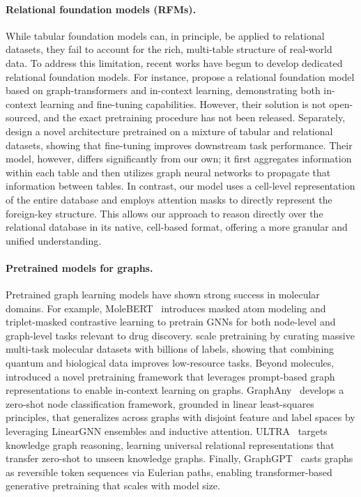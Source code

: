 \paragraph{Relational foundation models (RFMs).}
While tabular foundation models can, in principle, be applied to relational datasets, they fail to account for the rich, multi-table structure of real-world data. To address this limitation, recent works have begun to develop dedicated relational foundation models.
For instance, \citet{kumorfm} propose a relational foundation model based on graph-transformers and in-context learning, demonstrating both in-context learning and fine-tuning capabilities. However, their solution is not open-sourced, and the exact pretraining procedure has not been released. Separately, \citet{griffin} design a novel architecture pretrained on a mixture of tabular and relational datasets, showing that fine-tuning improves downstream task performance. Their model, however, differs significantly from our own; it first aggregates information within each table and then utilizes graph neural networks to propagate that information between tables. In contrast, our model uses a cell-level representation of the entire database and employs attention masks to directly represent the foreign-key structure. This allows our approach to reason directly over the relational database in its native, cell-based format, offering a more granular and unified understanding.

\paragraph{Pretrained models for graphs.}
Pretrained graph learning models have shown strong success in molecular domains. For example, MoleBERT~\citep{xia2023mole} introduces masked atom modeling and triplet-masked contrastive learning to pretrain GNNs for both node-level and graph-level tasks relevant to drug discovery. \citet{beaini2024towards} scale pretraining by curating massive multi-task molecular datasets with billions of labels, showing that combining quantum and biological data improves low-resource tasks.
Beyond molecules, \cite{huang2023prodigy} introduced a novel pretraining framework that leverages prompt-based graph representations to enable in-context learning on graphs. GraphAny~\citep{zhaofully} develops a zero-shot node classification framework, grounded in linear least-squares principles, that generalizes across graphs with disjoint feature and label spaces by leveraging LinearGNN ensembles and inductive attention. ULTRA~\citep{galkintowards} targets knowledge graph reasoning, learning universal relational representations that transfer zero-shot to unseen knowledge graphs. Finally, GraphGPT~\citep{zhaographgpt} casts graphs as reversible token sequences via Eulerian paths, enabling transformer-based generative pretraining that scales with model size. 



